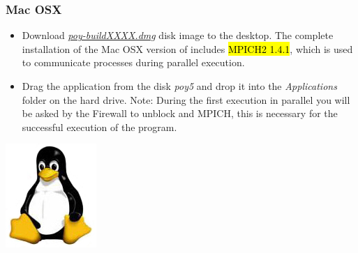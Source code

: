 \begin{flushleft}
\begin{minipage}[t]{0.88\textwidth}
	   	\subsubsection*{Mac OSX}
	\end{minipage}
	            \begin{itemize}
			\item Download
            \href{http://research.amnh.org/scicomp/projects/poy.php}{\emph{poy-buildXXXX.dmg}} disk image 
             to the desktop. The complete installation of the Mac OSX version of \poy includes \hl{MPICH2 1.4.1}, which is used to communicate processes during parallel execution.
            		\item Drag the \poy application from the disk \emph{poy5} and drop it into the \emph{Applications}
            folder on the hard drive.  Note: During the first execution in parallel you will be asked by the Firewall to unblock \poy and MPICH, this is necessary for the successful execution of the program.
		\end{itemize}

	\begin{minipage}[c]{0.074\textwidth}
   		\includegraphics[width=\textwidth]{doc/figures/figlogolinux.jpg}
	\end{minipage}
	\,
	\begin{minipage}[t]{0.88\textwidth}

\end{minipage}
\end{flushleft}
